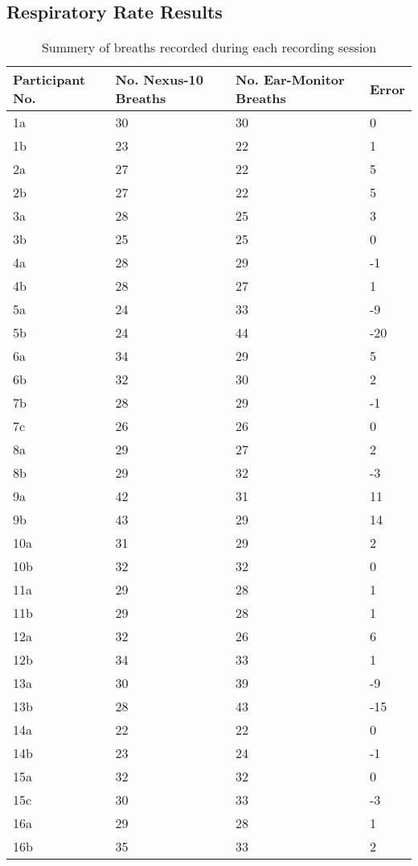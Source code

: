 \subsection{Respiratory Rate Results}
\label{sec:Respiratory Rate Results}

\begin{table}[H]
\caption{Summery of breaths recorded during each recording session}
\label{tab:RSP_Data}
\centering
\begin{tabular}{|P{1.9cm}|P{3.2cm}|P{3.2cm}|P{1.2cm}|} 
\hline
Participant No.	&	No. Nexus-10 Breaths	&	No. Ear-Monitor Breaths	&	Error	\\
\hline
1a	&	30	&	30	&	0	\\
1b	&	23	&	22	&	1	\\
2a	&	27	&	22	&	5	\\
2b	&	27	&	22	&	5	\\
3a	&	28	&	25	&	3	\\
3b	&	25	&	25	&	0	\\
4a	&	28	&	29	&	-1	\\
4b	&	28	&	27	&	1	\\
5a	&	24	&	33	&	-9	\\
5b	&	24	&	44	&	-20	\\
6a	&	34	&	29	&	5	\\
6b	&	32	&	30	&	2	\\
7b	&	28	&	29	&	-1	\\
7c	&	26	&	26	&	0	\\
8a	&	29	&	27	&	2	\\
8b	&	29	&	32	&	-3	\\
9a	&	42	&	31	&	11	\\
9b	&	43	&	29	&	14	\\
10a	&	31	&	29	&	2	\\
10b	&	32	&	32	&	0	\\
11a	&	29	&	28	&	1	\\
11b	&	29	&	28	&	1	\\
12a	&	32	&	26	&	6	\\
12b	&	34	&	33	&	1	\\
13a	&	30	&	39	&	-9	\\
13b	&	28	&	43	&	-15	\\
14a	&	22	&	22	&	0	\\
14b	&	23	&	24	&	-1	\\
15a	&	32	&	32	&	0	\\
15c	&	30	&	33	&	-3	\\
16a	&	29	&	28	&	1	\\
16b	&	35	&	33	&	2	\\
\hline
\end{tabular}
\end{table}

